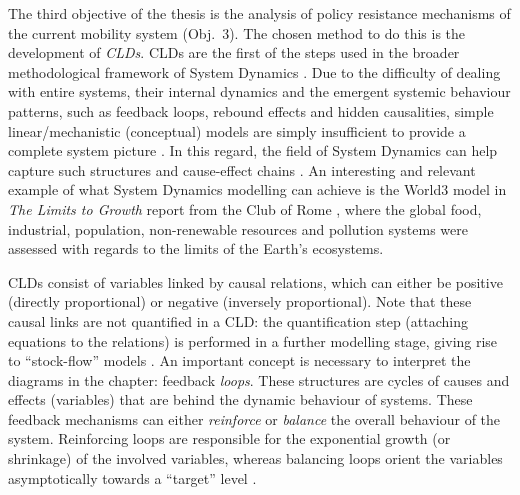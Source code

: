 The third objective of the thesis is the analysis of policy resistance mechanisms of the current mobility system (Obj.~3). The chosen method to do this is the development of \emph{\glspl{CLD}}. CLDs are the first of the steps used in the broader methodological framework of System Dynamics \parencite{ghosh2015_DynamicSystemsEveryone}. Due to the difficulty of dealing with entire systems, their internal dynamics and the emergent systemic behaviour patterns, such as feedback loops, rebound effects and hidden causalities, simple linear/mechanistic (conceptual) models are simply insufficient to provide a complete system picture \parencite{forrester1972_CounterintuitiveBehaviorSocial}. In this regard, the field of System Dynamics can help capture such structures and cause-effect chains \parencite{hjorth2006_Navigatingtowardssustainable}. An interesting and relevant example of what System Dynamics modelling can achieve is the World3 model in \emph{The Limits to Growth} report from the Club of Rome \parencite{meadows1972_LimitsGrowthReport}, where the global food, industrial, population, non-renewable resources and pollution systems were assessed with regards to the limits of the Earth's ecosystems.


CLDs consist of variables linked by causal relations, which can either be positive (directly proportional) or negative (inversely proportional). Note that these causal links are not quantified in a CLD: the quantification step (attaching equations to the relations) is performed in a further modelling stage, giving rise to ``stock-flow'' models \parencite{sterman2000_BusinessDynamics}. An important concept is necessary to interpret the diagrams in the  chapter: feedback \emph{loops}. These structures are cycles of causes and effects (variables) that are behind the dynamic behaviour of systems. These feedback mechanisms can either \emph{reinforce} or \emph{balance} the overall behaviour of the system. Reinforcing loops are responsible for the exponential growth (or shrinkage) of the involved variables, whereas balancing loops orient the variables asymptotically towards a ``target'' level \parencite{sterman2000_BusinessDynamics}.


